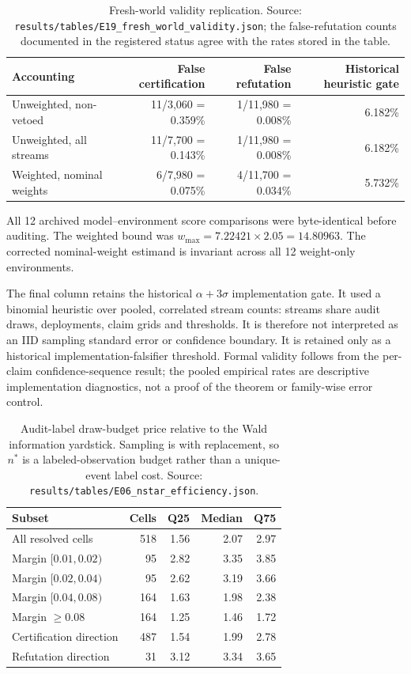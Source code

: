 \documentclass[11pt,a4paper]{article}
\begin{document}
\begin{table}[H]
\centering
\small
\caption{Fresh-world validity replication. Source: \texttt{results/tables/E19\_fresh\_world\_validity.json}; the false-refutation counts documented in the registered status agree with the rates stored in the table.}
\label{tab:e19}
\begin{tabular}{lrrr}
\toprule
Accounting & False certification & False refutation & Historical heuristic gate \\
\midrule
Unweighted, non-vetoed & 11/3,060 = 0.359\% & 1/11,980 = 0.008\% & 6.182\% \\
Unweighted, all streams & 11/7,700 = 0.143\% & 1/11,980 = 0.008\% & 6.182\% \\
Weighted, nominal weights & 6/7,980 = 0.075\% & 4/11,700 = 0.034\% & 5.732\% \\
\bottomrule
\end{tabular}

\vspace{0.5em}
\parbox{0.94\linewidth}{\footnotesize All 12 archived model--environment
score comparisons were byte-identical before auditing. The weighted bound
was $w_{\max}=7.22421\times2.05=14.80963$. The corrected nominal-weight
estimand is invariant across all 12 weight-only environments.}
\parbox{0.94\linewidth}{\footnotesize The final column retains the historical
$\alpha+3\sigma$ implementation gate. It used a binomial heuristic over pooled,
correlated stream counts: streams share audit draws, deployments, claim grids
and thresholds. It is therefore not interpreted as an IID sampling standard
error or confidence boundary. It is retained only as a historical
implementation-falsifier threshold. Formal validity follows from the
per-claim confidence-sequence result; the pooled empirical rates are
descriptive implementation diagnostics, not a proof of the theorem or
family-wise error control.}
\end{table}

\begin{table}[H]
\centering
\small
\caption{Audit-label draw-budget price relative to the Wald information
yardstick. Sampling is with replacement, so $n^*$ is a labeled-observation
budget rather than a unique-event label cost. Source:
\texttt{results/tables/E06\_nstar\_efficiency.json}.}
\label{tab:nstar}
\begin{tabular}{lrrrr}
\toprule
Subset & Cells & Q25 & Median & Q75 \\
\midrule
All resolved cells & 518 & 1.56 & 2.07 & 2.97 \\
Margin $[0.01,0.02)$ & 95 & 2.82 & 3.35 & 3.85 \\
Margin $[0.02,0.04)$ & 95 & 2.62 & 3.19 & 3.66 \\
Margin $[0.04,0.08)$ & 164 & 1.63 & 1.98 & 2.38 \\
Margin $\geq0.08$ & 164 & 1.25 & 1.46 & 1.72 \\
Certification direction & 487 & 1.54 & 1.99 & 2.78 \\
Refutation direction & 31 & 3.12 & 3.34 & 3.65 \\
\bottomrule
\end{tabular}
\end{table}
\end{document}
